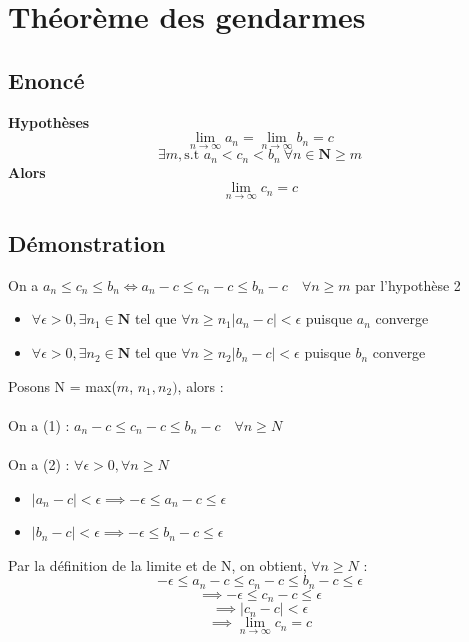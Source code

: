 \documentclass{article}
\begin{document}
\newpage

\section{Théorème des gendarmes}

\subsection{Enoncé}

\textbf{Hypothèses} \\
\[ \lim_{n\to\infty}a_n = \lim_{n\to\infty}b_n = c \]
\[ \exists m, \text{s.t } a_n < c_n < b_n\ \forall n \in \mathbf{N} \geq m \]
\textbf{Alors} \\
\[ \lim_{n\to\infty}c_n = c \]

\subsection{Démonstration}

On a $a_n \leq c_n \leq b_n \Leftrightarrow a_n - c \leq c_n - c \leq b_n - c \quad \forall n \geq m$ par l'hypothèse 2 \\
\begin{itemize}
    \item $\forall \epsilon > 0,\exists n_1 \in \mathbf{N}$ tel que $\forall n\geq n_1 \lvert a_n - c \lvert < \epsilon$ puisque $a_n$ converge
    \item $\forall \epsilon > 0,\exists n_2 \in \mathbf{N}$ tel que $\forall n\geq n_2 \lvert b_n - c \lvert < \epsilon$ puisque $b_n$ converge
\end{itemize}
Posons N = max($m$, $n_1, n_2)$, alors : \\\\
On a (1) : $a_n - c \leq c_n - c \leq b_n - c \quad \forall n \geq N$\\\\
On a (2) : $\forall \epsilon > 0, \forall n\geq N$
\begin{itemize}
    \item $ \lvert a_n - c \lvert < \epsilon \implies -\epsilon \leq a_n - c \leq \epsilon$
    \item $ \lvert b_n - c \lvert < \epsilon \implies -\epsilon \leq b_n - c \leq \epsilon$
\end{itemize}
Par la définition de la limite et de N, on obtient, $\forall n\geq N$ :
\[ -\epsilon \leq a_n - c \leq c_n - c \leq b_n - c \leq \epsilon  \]
\[ \implies -\epsilon\leq c_n - c \leq \epsilon \]
\[ \implies \lvert c_n - c \lvert < \epsilon \]
\[ \implies \lim_{n\to\infty}c_n = c \]
\end{document}
